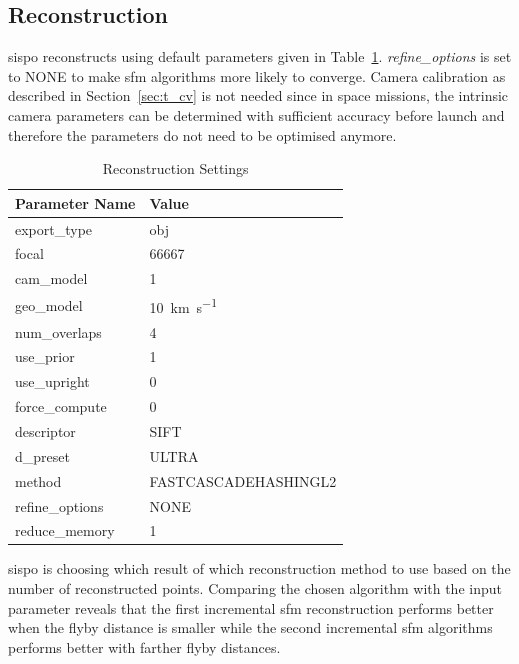 \clearpage

\subsection{Reconstruction}
\gls{sispo} reconstructs using default parameters given in Table~\ref{tab:comp_settings}. \textit{refine\_options} is set to NONE to make \gls{sfm} algorithms more likely to converge. Camera calibration as described in Section~\ref{sec:t_cv} is not needed since in space missions, the intrinsic camera parameters can be determined with sufficient accuracy before launch and therefore the parameters do not need to be optimised anymore.

\begin{table}[htb]
    \centering
    \caption{Reconstruction Settings}
    \label{tab:comp_settings}
    \begin{tabular}{l|l}
        \textbf{Parameter Name} & \textbf{Value} \\ \hline
        export\_type       & obj   \\
        focal & 66667 \\
        cam\_model & \SI{1}{}     \\
        geo\_model & \SI{10}{\kilo\meter\per\second} \\
        num\_overlaps  & \SI{4}{} \\
        use\_prior & \SI{1}{} \\
        use\_upright & \SI{0}{} \\
        force\_compute & \SI{0}{} \\
        descriptor & SIFT \\
        d\_preset & ULTRA \\
        method & FASTCASCADEHASHINGL2 \\
        refine\_options & NONE \\
        reduce\_memory & 1
    \end{tabular}
\end{table}

\gls{sispo} is choosing which result of which reconstruction method to use based on the number of reconstructed points. Comparing the chosen algorithm with the input parameter reveals that the first incremental \gls{sfm} reconstruction performs better when the flyby distance is smaller while the second incremental \gls{sfm} algorithms performs better with farther flyby distances.

